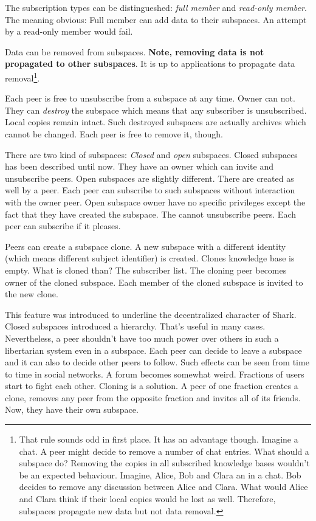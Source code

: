 The subscription types can be distingueshed: {\it full member} and {\it read-only member}. The meaning obvious: Full member can add data to their subspaces. An attempt by a read-only member would fail. 

Data can be removed from subspaces. {\bf Note, removing data is not propagated to other subspaces}. It is up to applications to propagate data removal\footnote{That rule sounds odd in first place. It has an advantage though. Imagine a chat. A peer might decide to remove a number of chat entries. What should a subspace do? Removing the copies in all subscribed knowledge bases wouldn't be an expected behaviour. Imagine, Alice, Bob and Clara an in a chat. Bob decides to remove any discussion between Alice and Clara. What would Alice and Clara think if their local copies would be lost as well. Therefore, subspaces propagate new data but not data removal.}.

Each peer is free to unsubscribe from a subspace at any time. Owner can not. They can {\it destroy} the subspace which means that any subscriber is unsubscribed. Local copies remain intact. Such destroyed subspaces are actually
archives which cannot be changed. Each peer is free to remove it, though.

There are two kind of subspaces: {\it Closed} and {\it open} subspaces. Closed subspaces has been described until now. They have an owner which can invite and unsubscribe peers. Open subspaces are slightly different. There are created as well by a peer. Each peer can subscribe to such subspaces without interaction with the owner peer. Open subspace owner have no specific privileges except the fact that they have created the subspace. The cannot unsubscribe peers. Each peer can subscribe if it pleases.

Peers can create a subspace clone. A new subspace with a different identity (which means different subject identifier) is created. Clones knowledge base is empty. What is cloned than? The subscriber list. The cloning peer becomes owner of the cloned subspace. Each member of the cloned subspace is invited to the new clone.

This feature was introduced to underline the decentralized character of Shark. Closed subspaces introduced a hierarchy. That's useful in many cases. Nevertheless, a peer shouldn't have too much power over others in such a libertarian system even in a subspace. Each peer can decide to leave a subspace and it can also to decide other peers to follow. Such effects can be seen from time to time in social networks. A forum becomes somewhat weird. Fractions of users start to fight each other. Cloning is a solution. A peer of one fraction creates a clone, removes any peer from the opposite fraction and invites all of its friends. Now, they have their own subspace.

